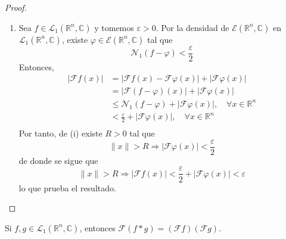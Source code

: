 \documentclass[12pt]{report}
\theoremstyle{largebreak}
\renewcommand{\leq}{\ensuremath{\leqslant}}
\newcommand\abs[1]{\ensuremath{\left|#1\right|}}
\newcommand\norm[1]{\ensuremath{\|#1\|}}
\newcommand{\N}[2]{\ensuremath{\mathcal{N}_{#1}\left(#2\right)}}
\newcommand{\fou}[1]{\ensuremath{\mathcal{F}#1}}
\begin{document}
\begin{proof}
\begin{enumerate}
            \item Sea $f\in\mathcal{L}_1(\mathbb{R}^n,\mathbb{C})$ y tomemos $\varepsilon>0$. Por la densidad de $\mathcal{E}(\mathbb{R}^n,\mathbb{C})$ en $\mathcal{L}_1(\mathbb{R}^n,\mathbb{C})$, existe $\varphi\in\mathcal{E}(\mathbb{R}^n,\mathbb{C})$ tal que
            \begin{equation*}
                \N{1}{f-\varphi}<\frac{\varepsilon}{2}
            \end{equation*}
            Entonces,
            \begin{equation*}
                \begin{split}
                    \abs{\fou{f}(x)}&=\abs{\fou{f}(x)-\fou{\varphi}(x)}+\abs{\fou{\varphi}(x)}\\
                    &=\abs{\fou{(f-\varphi)}(x)}+\abs{\fou{\varphi}(x)}\\
                    &\leq\N{1}{f-\varphi}+\abs{\fou{\varphi}(x)},\quad\forall x\in\mathbb{R}^n \\
                    &<\frac{\varepsilon}{2}+\abs{\fou{\varphi}(x)},\quad\forall x\in\mathbb{R}^n \\
                \end{split}
            \end{equation*}
            Por tanto, de (i) existe $R>0$ tal que
            \begin{equation*}
                \norm{x}>R\Rightarrow\abs{\fou{\varphi}(x)}<\frac{\varepsilon}{2}
            \end{equation*}
            de donde se sigue que
            \begin{equation*}
                \norm{x}>R\Rightarrow\abs{\fou{f}(x)}<\frac{\varepsilon}{2}+\abs{\fou{\varphi}(x)}<\varepsilon
            \end{equation*}
            lo que prueba el resultado.
        \end{enumerate}
    \end{proof}

    \begin{theor}
        Si $f,g\in\mathcal{L}_1(\mathbb{R}^n,\mathbb{C})$, entonces $\fou{(f*g)}=(\fou{f})(\fou{g})$.
    \end{theor}
\end{document}
